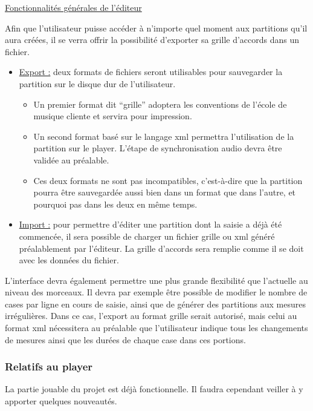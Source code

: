\underline{Fonctionnalités générales de l'éditeur}

Afin que l'utilisateur puisse accéder à n'importe quel moment aux partitions qu'il aura créées, il se verra offrir la possibilité d'exporter sa grille d'accords dans un fichier.

\begin{itemize}
 \item \underline{Export :} deux formats de fichiers seront utilisables pour sauvegarder la partition sur le disque dur de l'utilisateur.
 \begin{itemize}
  \item Un premier format dit “grille” adoptera les conventions de l'école de musique cliente et servira pour impression.
  \item Un second format basé sur le langage xml permettra l'utilisation de la partition sur le player. L'étape de synchronisation audio devra être validée au préalable.
  \item Ces deux formats ne sont pas incompatibles, c'est-à-dire que la partition pourra être sauvegardée aussi bien dans un format que dans l'autre, et pourquoi pas dans les deux en même temps.
 \end{itemize}
 \item \underline{Import :} pour permettre d'éditer une partition dont la saisie a déjà été commencée, il sera possible de charger un fichier grille ou xml généré préalablement par l'éditeur. La grille d'accords sera remplie comme il se doit avec les données du fichier.
\end{itemize}

L'interface devra également permettre une plus grande flexibilité que l'actuelle au niveau des morceaux. Il devra par exemple être possible de modifier le nombre de cases par ligne en cours de saisie, ainsi que de générer des partitions aux mesures irrégulières. Dans ce cas, l'export au format grille serait autorisé, mais celui au format xml nécessitera au préalable que l'utilisateur indique tous les changements de mesures ainsi que les durées de chaque case dans ces portions.

\subsubsection*{Relatifs au player}

La partie jouable du projet est déjà fonctionnelle. Il faudra cependant veiller à y apporter quelques nouveautés.

